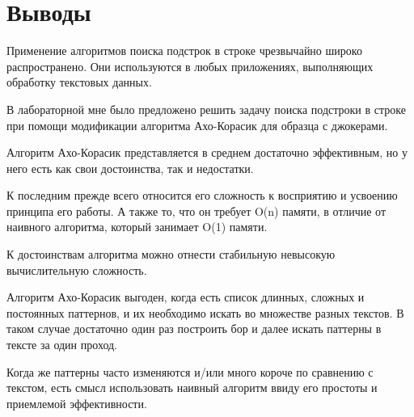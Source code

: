 \section{Выводы}
Применение алгоритмов поиска подстрок в строке чрезвычайно широко распространено. Они используются в любых приложениях, выполняющих обработку текстовых данных.

В лабораторной мне было предложено решить задачу поиска подстроки в строке при помощи модификации алгоритма Ахо-Корасик для образца с джокерами.

Алгоритм Ахо-Корасик представляется в среднем достаточно эффективным, но у него есть как свои достоинства, так и недостатки. 

К последним прежде всего относится его сложность к восприятию и усвоению принципа его работы. А также то, что он требует O(n) памяти, в отличие от наивного алгоритма, который занимает O(1) памяти.

К достоинствам алгоритма можно отнести стабильную невысокую вычислительную сложность.

Алгоритм Ахо-Корасик выгоден, когда есть список длинных, сложных и постоянных паттернов, и их необходимо искать во множестве разных текстов. В таком случае достаточно один раз построить бор и далее искать паттерны в тексте за один проход.

Когда же паттерны часто изменяются и/или много короче по сравнению с текстом, есть смысл использовать наивный алгоритм ввиду его простоты и приемлемой эффективности.
\pagebreak

